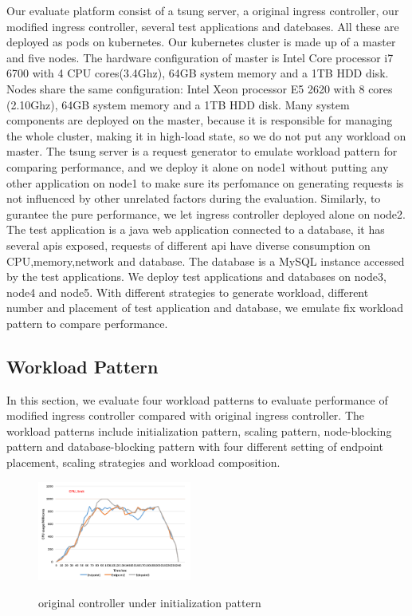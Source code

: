 Our evaluate platform consist of a tsung server, a original ingress controller, our modified ingress controller, several test applications and datebases.
All these are deployed as pods on kubernetes. Our kubernetes cluster is made up of a master and five nodes. The hardware configuration of master is Intel Core processor i7 6700 with 4 CPU cores(3.4Ghz), 64GB system memory and
a 1TB HDD disk. Nodes share the same configuration: Intel Xeon processor E5 2620 with 8 cores (2.10Ghz), 64GB system memory and a 1TB HDD disk. Many system components are deployed on the master, because it is responsible for managing the whole cluster, making it in high-load state, so we do not put any workload on master.
The tsung server is a request generator to emulate workload pattern for comparing performance, and we deploy it alone on node1 without putting any other application on node1 to make sure its perfomance on generating requests is not influenced by other unrelated factors during the evaluation.
Similarly, to gurantee the pure performance, we let ingress controller deployed alone on node2. The test application is a java web application connected to a database, it has several apis exposed, requests of different api have diverse consumption on CPU,memory,network and database.
The database is a MySQL instance accessed by the test applications. We deploy test applications and databases on node3, node4 and node5. With different strategies to generate workload, different number and placement of test application and database, we emulate fix workload pattern to
compare performance.

\subsection{Workload Pattern}
\label{subsec:workload_pattern}
In this section, we evaluate four workload patterns to evaluate performance of modified ingress controller compared with original ingress controller.
The workload patterns include initialization pattern, scaling pattern, node-blocking pattern and database-blocking pattern with four different setting of
endpoint placement, scaling strategies and workload composition.
\begin{figure}[!htb]
 \centering
 \includegraphics[width=0.45\textwidth]{images/data1.png}\\
 \caption{original controller under initialization pattern}
 \label{fig:original_initialization}
\end{figure}

